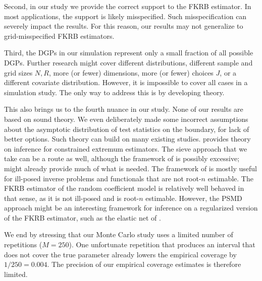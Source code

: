 Second, in our study we provide the correct support to the FKRB estimator.
In most applications, the support is likely misspecified.
Such misspecification can severely impact the results.
For this reason, our results may not generalize to grid-misspecified FKRB estimators.

Third, the DGPs in our simulation represent only a small fraction of all possible DGPs.
Further research might cover different distributions, different sample and grid sizes $N, R$, more (or fewer) dimensions, more (or fewer) choices $J$, or a different covariate distribution.
However, it is impossible to cover all cases in a simulation study.
The only way to address this is by developing theory.

This also brings us to the fourth nuance in our study.
None of our results are based on sound theory.
We even deliberately made some incorrect assumptions about the asymptotic distribution of test statistics on the boundary, for lack of better options.
Such theory can build on many existing studies.
\citet{Li2025Inference,Li2025The} provides theory on inference for constrained extremum estimators.
The sieve approach that we take can be a route as well, although the framework of \citet{ChenPouzo2015} is possibly excessive; \citet{ChenLintonVanKeilegom2003} might already provide much of what is needed.
The framework of \citet{ChenPouzo2015} is mostly useful for ill-posed inverse problems and functionals that are not root-$n$ estimable.
The FKRB estimator of the random coefficient model is relatively well behaved in that sense, as it is not ill-posed and is root-$n$ estimable.
However, the PSMD approach might be an interesting framework for inference on a regularized version of the FKRB estimator, such as the elastic net of \citet{HeissHetzeneckerOsterhaus2022}.

We end by stressing that our Monte Carlo study uses a limited number of repetitions ($M=250$).
One unfortunate repetition that produces an interval that does not cover the true parameter already lowers the empirical coverage by $1/250 = 0.004$.
The precision of our empirical coverage estimates is therefore limited.